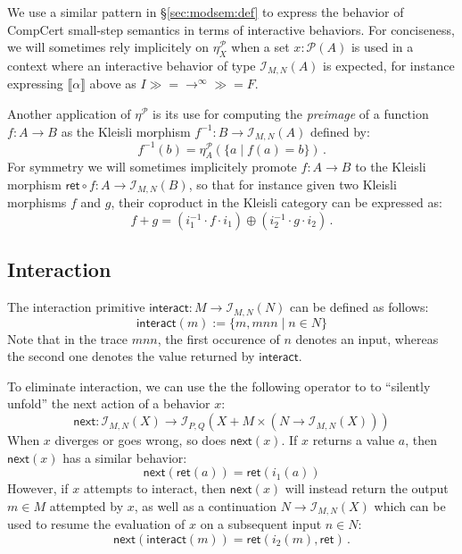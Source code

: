 \documentclass{article}
\newcommand{\kw}[1]{\ensuremath{ \mathsf{#1} }}
\newcommand{\bind}{\gg\!\!=}
\begin{document}
We use a similar pattern in \S\ref{sec:modsem:def}
to express the behavior of CompCert small-step semantics
in terms of interactive behaviors.
For conciseness,
we will sometimes rely implicitely on $\eta_X^\mathcal{P}$
when a set $x : \mathcal{P}(A)$ is used
in a context where an interactive behavior
of type $\mathcal{I}_{M,N}(A)$ is expected,
for instance expressing $\llbracket \alpha \rrbracket$ above as
$I \bind {\rightarrow}^\infty \bind F$.

Another application of $\eta^\mathcal{P}$
is its use for computing the \emph{preimage} of a function
$f : A \rightarrow B$ as the Kleisli morphism
$f^{-1} : B \rightarrow \mathcal{I}_{M,N}(A)$ defined by:
\[
    f^{-1}(b) = \eta^\mathcal{P}_A(\{ a \mid f(a) = b \}) \,.
\]
For symmetry we will sometimes implicitely promote
$f : A \rightarrow B$ to the Kleisli morphism
$\kw{ret} \circ f : A \rightarrow \mathcal{I}_{M,N}(B)$,
so that for instance given two Kleisli morphisms $f$ and $g$,
their coproduct in the Kleisli category can be expressed as:
\[
    f + g = (i_1^{-1} \cdot f \cdot i_1) \oplus (i_2^{-1} \cdot g \cdot i_2) \,.
\]


\subsection{Interaction} %

The interaction primitive
$\kw{interact} : M \rightarrow \mathcal{I}_{M,N}(N)$
can be defined as follows:
\[
    \kw{interact}(m) := \{ m, mnn \mid n \in N \}
\]
Note that in the trace $mnn$,
the first occurence of $n$ denotes an input,
whereas the second one denotes the value returned by $\kw{interact}$.

To eliminate interaction,
we can use the the following operator to
to ``silently unfold'' the next action of a behavior $x$:
\[
    \kw{next} :
       \mathcal{I}_{M,N}(X) \rightarrow
       \mathcal{I}_{P,Q}(X + M \times (N \rightarrow \mathcal{I}_{M,N}(X)))
\]
When $x$ diverges or goes wrong, so does $\kw{next}(x)$.
If $x$ returns a value $a$, then $\kw{next}(x)$
has a similar behavior:
\[
    \kw{next}(\kw{ret}(a)) = \kw{ret}(i_1(a))
\]
However,
if $x$ attempts to interact,
then $\kw{next}(x)$ will instead
return the output $m \in M$ attempted by $x$,
as well as a continuation $N \rightarrow \mathcal{I}_{M,N}(X)$
which can be used to resume the evaluation of $x$
on a subsequent input $n \in N$:
\[
    \kw{next}(\kw{interact}(m)) = \kw{ret}(i_2(m), \kw{ret}) \,.
\]
\end{document}
